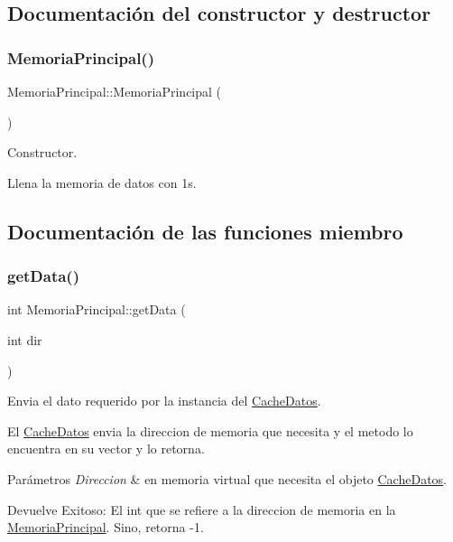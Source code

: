 

\subsection{Documentación del constructor y destructor}
\mbox{\label{classMemoriaPrincipal_a1ffb9d5ffec05ed9bd0fc5c3ca51d200}} 
\subsubsection{\texorpdfstring{Memoria\+Principal()}{MemoriaPrincipal()}}
{\footnotesize\ttfamily Memoria\+Principal\+::\+Memoria\+Principal (\begin{DoxyParamCaption}{ }\end{DoxyParamCaption})}



Constructor. 

Llena la memoria de datos con 1s. 

\subsection{Documentación de las funciones miembro}
\mbox{\label{classMemoriaPrincipal_aaf5f5abab3ddb40a88c9c695c02d29d3}} 
\subsubsection{\texorpdfstring{get\+Data()}{getData()}}
{\footnotesize\ttfamily int Memoria\+Principal\+::get\+Data (\begin{DoxyParamCaption}\item[{int}]{dir }\end{DoxyParamCaption})}



Envia el dato requerido por la instancia del \hyperlink{classCacheDatos}{Cache\+Datos}. 

El \hyperlink{classCacheDatos}{Cache\+Datos} envia la direccion de memoria que necesita y el metodo lo encuentra en su vector y lo retorna. 
\begin{DoxyParams}{Parámetros}
{\em Direccion} & en memoria virtual que necesita el objeto \hyperlink{classCacheDatos}{Cache\+Datos}. \\
\hline
\end{DoxyParams}
\begin{DoxyReturn}{Devuelve}
Exitoso\+: El int que se refiere a la direccion de memoria en la \hyperlink{classMemoriaPrincipal}{Memoria\+Principal}. Sino, retorna -\/1. 
\end{DoxyReturn}
\mbox{\label{classMemoriaPrincipal_a0ffe52092ed587006788f4c3d8965f47}} 
